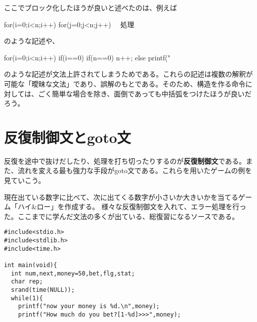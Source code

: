 ここでブロック化したほうが良いと述べたのは、例えば
\begin{code}
for(i=0;i<n;i++) for(j=0;j<n;j++){
　処理
}
\end{code}
のような記述や、
\begin{code}
for(i=0;i<n;i++) if(i==0) if(n==0) n++; else printf("%
\end{code}
のような記述が文法上許されてしまうためである。これらの記述は複数の解釈が可能な「曖昧な文法」であり、誤解のもとである。そのため、構造を作る命令に対しては、ごく簡単な場合を除き、面倒であっても中括弧をつけたほうが良いだろう。

\section{反復制御文とgoto文}
反復を途中で抜けだしたり、処理を打ち切ったりするのが\textbf{反復制御文}である。また、流れを変える最も強力な手段がgoto文である。これらを用いたゲームの例を見ていこう。
\begin{boxnote}
現在出ている数字に比べて、次に出てくる数字が小さいか大きいかを当てるゲーム「ハイ\&ロー」を作成する。
様々な反復制御文を入れて、エラー処理を行った。ここまでに学んだ文法の多くが出ている、総復習になるソースである。
\begin{lstlisting}[caption=ハイ\&ロー,label=program5_6]
#include<stdio.h>
#include<stdlib.h>
#include<time.h>

int main(void){
  int num,next,money=50,bet,flg,stat;
  char rep;
  srand(time(NULL));
  while(1){
    printf("now your money is %d.\n",money);
    printf("How much do you bet?[1-%d]>>>",money);
\end{lstlisting}

\end{boxnote}
